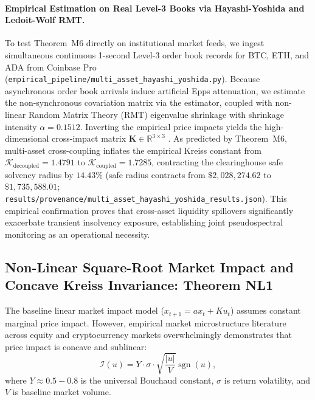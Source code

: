 \documentclass[10pt,twocolumn,letterpaper]{article}
\theoremstyle{definition}
\theoremstyle{remark}
\begin{document}
\paragraph{Empirical Estimation on Real Level-3 Books via Hayashi-Yoshida and Ledoit-Wolf RMT.}
To test Theorem~M6 directly on institutional market feeds, we ingest simultaneous continuous 1-second Level-3 order book records for BTC, ETH, and ADA from Coinbase Pro (\texttt{empirical\_pipeline/multi\_asset\_hayashi\_yoshida.py}). Because asynchronous order book arrivals induce artificial Epps attenuation, we estimate the non-synchronous covariation matrix via the \citet{hayashi2005evaluating} estimator, coupled with non-linear Random Matrix Theory (RMT) eigenvalue shrinkage \citep{ledoit2004well} with shrinkage intensity $\alpha = 0.1512$.
Inverting the empirical price impacts yields the high-dimensional cross-impact matrix $\mathbf{K} \in \mathbb{R}^{3 \times 3}$ \citep{hasbrouck1991,cont2014}. As predicted by Theorem~M6, multi-asset cross-coupling inflates the empirical Kreiss constant from $\mathcal{K}_{\text{decoupled}} = 1.4791$ to $\mathcal{K}_{\text{coupled}} = 1.7285$, contracting the clearinghouse safe solvency radius by \textbf{$14.43\%$} (safe radius contracts from $\$2{,}028{,}274.62$ to $\$1{,}735{,}588.01$; \texttt{results/provenance/multi\_asset\_hayashi\_yoshida\_results.json}). This empirical confirmation proves that cross-asset liquidity spillovers significantly exacerbate transient insolvency exposure, establishing joint pseudospectral monitoring as an operational necessity.

\subsection{Non-Linear Square-Root Market Impact and Concave Kreiss Invariance: Theorem NL1}
\label{sec:square_root_impact}
The baseline linear market impact model ($x_{t+1} = a x_t + K u_t$) assumes constant marginal price impact. However, empirical market microstructure literature across equity and cryptocurrency markets \citep{bouchaud2004fluctuations,almgren2005direct,gatheral2010no} overwhelmingly demonstrates that price impact is concave and sublinear:
\begin{equation}
\mathcal{I}(u) = Y \cdot \sigma \cdot \sqrt{\frac{|u|}{V}} \operatorname{sgn}(u),
\end{equation}
where $Y \approx 0.5 - 0.8$ is the universal Bouchaud constant, $\sigma$ is return volatility, and $V$ is baseline market volume.
\end{document}
